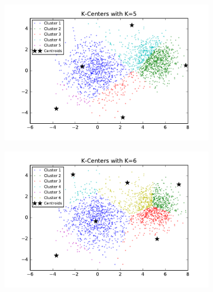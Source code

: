 \begin{description}
\begin{description}
\begin{figure}[!h]
\begin{subfigure}[b]{0.475\textwidth}
        \end{subfigure}
        \begin{subfigure}[b]{0.475\textwidth}  
            \centering 
            \includegraphics[width=\textwidth]{./figures/clustering_kCenter_5.pdf}
        \end{subfigure}
        \hfill
        \begin{subfigure}[b]{0.475\textwidth}   
            \centering 
            \includegraphics[width=\textwidth]{./figures/clustering_kCenter_6.pdf}
        \end{subfigure}
        \begin{subfigure}[b]{0.475\textwidth}   
            \centering 

\end{subfigure}
\end{figure}
\end{description}
\end{description}
